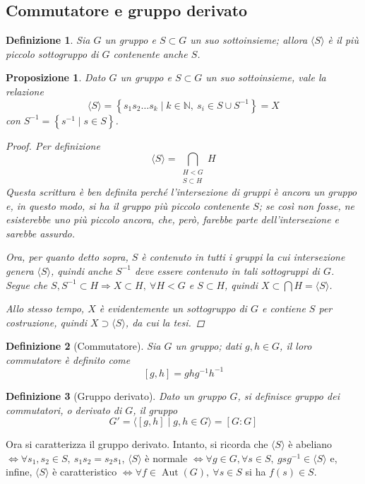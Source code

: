 \documentclass[11pt]{scrartcl}
\theoremstyle{style1}
\newtheorem{prop}{Proposizione}[section]
\newtheorem{definizione}{Definizione}[section]
\numberwithin{equation}{subsection}
\begin{document}
\subsection{Commutatore e gruppo derivato}


\begin{definizione}
	Sia $G$ un gruppo e $S \subset G$ un suo sottoinsieme; allora $\langle S \rangle$ \`e il pi\`u piccolo sottogruppo di $G$ contenente anche $S$.
\end{definizione}
\begin{prop}
	Dato $G$ un gruppo e $S \subset G$ un suo sottoinsieme, vale la relazione
	\[
	\langle S \rangle= \left\{ s_1s_2 \ldots s_k  \mid k \in \mathbb{N}, \ s_i \in S \cup S^{-1} \right\} = X
	\] 
	con $S^{-1}= \left\{ s^{-1}  \mid  s \in S \right\} $.
	\begin{proof}
		Per definizione
		\[
			\langle S \rangle= \bigcap_{\substack{H < G \\ S \subset H}} H
		\] 
		Questa scrittura \`e ben definita perch\'e l'intersezione di gruppi \`e ancora un gruppo e, in questo modo, si ha il gruppo pi\`u piccolo contenente $S$; se cos\`i non fosse, ne esisterebbe uno pi\`u piccolo ancora, che, per\`o, farebbe parte dell'intersezione e sarebbe assurdo.

		Ora, per quanto detto sopra, $S$ \`e contenuto in tutti i gruppi la cui intersezione genera $\langle S \rangle$, quindi anche $S^{-1} $ deve essere contenuto in tali sottogruppi di $G$.
		Segue che $S,S^{-1}\subset H \Rightarrow X \subset H, \ \forall H < G$ e $S \subset H$, quindi $X \subset \bigcap H = \langle S \rangle$.

		Allo stesso tempo, $X$ \`e evidentemente un sottogruppo di $G$ e contiene $S$ per costruzione, quindi $X \supset \langle S \rangle$, da cui la tesi.
	\end{proof}
\end{prop}
\begin{definizione}
	[Commutatore]
	Sia $G$ un gruppo; dati $g,h \in G$, il loro \textit{commutatore} \`e definito come
	\[
		[g,h] = ghg^{-1} h^{-1}
	\] 
\end{definizione}
\begin{definizione}
	[Gruppo derivato]
	Dato un gruppo $G$, si definisce \textit{gruppo dei commutatori}, o \textit{derivato} di $G$, il gruppo 
	\[
		G ' = \langle [g,h]  \mid g,h \in G \rangle = [G:G]
	\] 
\end{definizione}
\noindent Ora si caratterizza il gruppo derivato.
Intanto, si ricorda che $\langle S \rangle$ \`e abeliano $\iff \forall s_1,s_2\in S , \  s_1s_2=s_2s_1$, $\langle S \rangle$ \`e normale $\iff \forall g \in G, \forall s \in S, \ gsg^{-1} \in \langle S \rangle$ e, infine, $\langle S \rangle$ \`e caratteristico $\iff \forall f \in \operatorname{Aut} (G) ,\ \forall s \in S$ si ha $f(s) \in S$.
\end{document}
